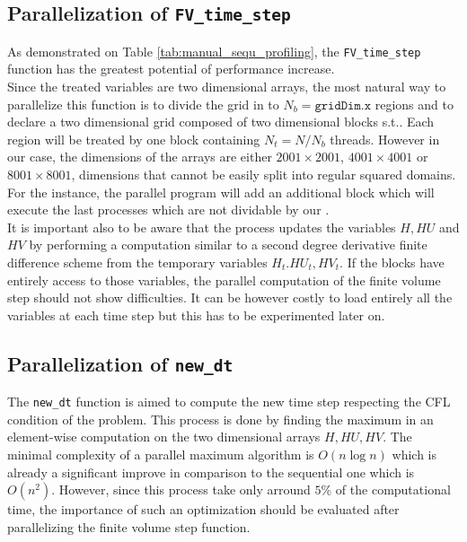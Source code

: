 \documentclass{article}
\begin{document}
\subsection{Parallelization of \texttt{FV\_time\_step}} 
As demonstrated on Table \ref{tab:manual_sequ_profiling}, the \texttt{FV\_time\_step} function has the greatest potential of performance increase.\\ Since the treated variables are two dimensional arrays, the most natural way to parallelize this function is to divide the grid in to $N_b = \texttt{gridDim.x}$ regions and to declare a two dimensional grid composed of two dimensional blocks s.t.. Each region will be treated by one block containing $N_t=N/N_b$ threads. However in our case, the dimensions of the arrays are either $2001\times2001$, $4001\times4001$ or $8001\times8001$, dimensions that cannot be easily split into regular squared domains. For the instance, the parallel program will add an additional block which will execute the last processes which are not dividable by our .\\
It is important also to be aware that the process updates the variables $H,HU$ and $HV$ by performing a computation similar to a second degree derivative finite difference scheme from the temporary variables $H_t.HU_t,HV_t$. If the blocks have entirely access to those variables, the parallel computation of the finite volume step should not show difficulties. It can be however costly to load entirely all the variables at each time step but this has to be experimented later on.

\subsection{Parallelization of \texttt{new\_dt}}
The \texttt{new\_dt} function is aimed to compute the new time step respecting the CFL condition of the problem. This process is done by finding the maximum in an element-wise computation on the two dimensional arrays $H,HU,HV$. The minimal complexity of a parallel maximum algorithm is $O(n\log n)$ which is already a significant improve in comparison to the sequential one which is $O(n^2)$. However, since this process take only arround $5\%$ of the computational time, the importance of such an optimization should be evaluated after parallelizing the finite volume step function.

\end{document}
